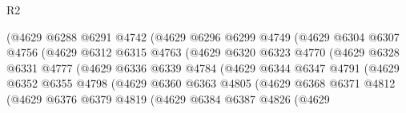 \begin{lexlean}{R2}
\begin{coremodule}
                              (@4629
                                @6288
                                @6291
                                @4742
                                (@4629
                                  @6296
                                  @6299
                                  @4749
                                  (@4629
                                    @6304
                                    @6307
                                    @4756
                                    (@4629
                                      @6312
                                      @6315
                                      @4763
                                      (@4629
                                        @6320
                                        @6323
                                        @4770
                                        (@4629
                                          @6328
                                          @6331
                                          @4777
                                          (@4629
                                            @6336
                                            @6339
                                            @4784
                                            (@4629
                                              @6344
                                              @6347
                                              @4791
                                              (@4629
                                                @6352
                                                @6355
                                                @4798
                                                (@4629
                                                  @6360
                                                  @6363
                                                  @4805
                                                  (@4629
                                                    @6368
                                                    @6371
                                                    @4812
                                                    (@4629
                                                      @6376
                                                      @6379
                                                      @4819
                                                      (@4629
                                                        @6384
                                                        @6387
                                                        @4826
                                                        (@4629

\end{coremodule}
\end{lexlean}
